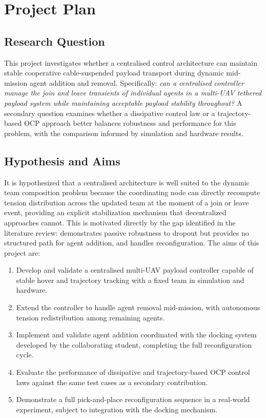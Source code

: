 \section{Project Plan}

\subsection{Research Question}

This project investigates whether a centralised control architecture can maintain stable cooperative cable-suspended payload transport during dynamic mid-mission agent addition and removal. Specifically: \textit{can a centralised controller manage the join and leave transients of individual agents in a multi-UAV tethered payload system while maintaining acceptable payload stability throughout?} A secondary question examines whether a dissipative control law or a trajectory-based OCP approach better balances robustness and performance for this problem, with the comparison informed by simulation and hardware results.

\subsection{Hypothesis and Aims}

It is hypothesized that a centralised architecture is well suited to the dynamic team composition problem because the coordinating node can directly recompute tension distribution across the updated team at the moment of a join or leave event, providing an explicit stabilization mechanism that decentralized approaches cannot. This is motivated directly by the gap identified in the literature review: \cite{quan2025swarm} demonstrates passive robustness to dropout but provides no structured path for agent addition, and \cite{tensionbased} handles reconfiguration. The aims of this project are:

\begin{enumerate}
    \item Develop and validate a centralised multi-UAV payload controller capable of stable hover and trajectory tracking with a fixed team in simulation and hardware.
    \item Extend the controller to handle agent removal mid-mission, with autonomous tension redistribution among remaining agents.
    \item Implement and validate agent addition coordinated with the docking system developed by the collaborating student, completing the full reconfiguration cycle.
    \item Evaluate the performance of dissipative and trajectory-based OCP control laws against the same test cases as a secondary contribution.
    \item Demonstrate a full pick-and-place reconfiguration sequence in a real-world experiment, subject to integration with the docking mechanism.
\end{enumerate}

